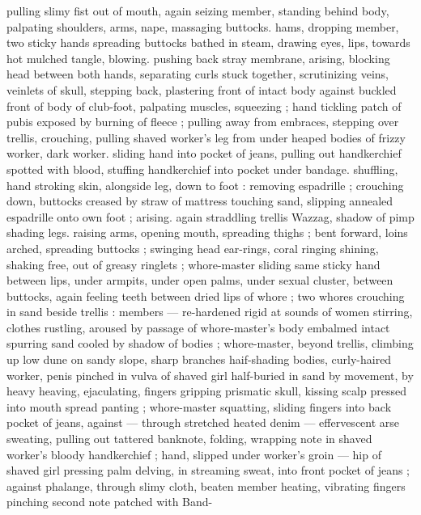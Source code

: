 pulling slimy fist out of mouth, again seizing member, standing 
behind body, palpating shoulders, arms, nape, massaging buttocks. 
hams, dropping member, two sticky hands spreading buttocks bathed 
in steam, drawing eyes, lips, towards hot mulched tangle, blowing. 
pushing back stray membrane, arising, blocking head between both 
hands, separating curls stuck together, scrutinizing veins, veinlets of 
skull, stepping back, plastering front of intact body against buckled 
front of body of club-foot, palpating muscles, squeezing ; hand 
tickling patch of pubis exposed by burning of fleece ; pulling away 
from embraces, stepping over trellis, crouching, pulling shaved 
worker's leg from under heaped bodies of frizzy worker, dark worker. 
sliding hand into pocket of jeans, pulling out handkerchief spotted 
with blood, stuffing handkerchief into pocket under bandage. 
shuffling, hand stroking skin, alongside leg, down to foot : removing 
espadrille ; crouching down, buttocks creased by straw of mattress 
touching sand, slipping annealed espadrille onto own foot ; arising. 
again straddling trellis {\col} Wazzag, shadow of pimp shading legs. 
raising arms, opening mouth, spreading thighs ; bent forward, loins 
arched, spreading buttocks ; swinging head {\col} ear-rings, coral ringing 
shining, shaking free, out of greasy ringlets ; whore-master sliding 
same sticky hand between lips, under armpits, under open palms, 
under sexual cluster, between buttocks, again feeling teeth between 
dried lips of whore ; two whores crouching in sand beside trellis : 
members --- re-hardened rigid at sounds of women stirring, clothes 
rustling, aroused by passage of whore-master's body embalmed 
intact {\dashcom} spurring sand cooled by shadow of bodies ; whore-master, 
beyond trellis, climbing up low dune {\col} on sandy slope, sharp 
branches haif-shading bodies, curly-haired worker, penis pinched in 
vulva of shaved girl half-buried in sand by movement, by heavy 
heaving, ejaculating, fingers gripping prismatic skull, kissing scalp 
pressed into mouth spread panting ; whore-master squatting, sliding 
fingers into back pocket of jeans, against --- through stretched 
heated denim --- effervescent arse sweating, pulling out tattered 
banknote, folding, wrapping note in shaved worker's bloody 
handkerchief ; hand, slipped under worker's groin --- hip of shaved 
girl pressing palm {\dashcom} delving, in streaming sweat, into front pocket 
of jeans ; against phalange, through slimy cloth, beaten member 
heating, vibrating \col fingers pinching second note patched with Band- 
